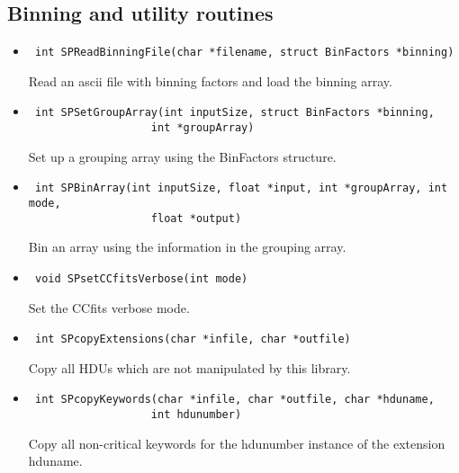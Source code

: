 \documentclass[11pt]{book}
\begin{document}
\subsection{Binning and utility routines}

\begin{itemize}

\item      \begin{verbatim} int SPReadBinningFile(char *filename, struct BinFactors *binning)\end{verbatim}

               Read an ascii file with binning factors and load the binning array.

\item      \begin{verbatim} int SPSetGroupArray(int inputSize, struct BinFactors *binning, 
                   int *groupArray)\end{verbatim}

               Set up a grouping array using the BinFactors structure.

\item      \begin{verbatim} int SPBinArray(int inputSize, float *input, int *groupArray, int mode, 
                   float *output)\end{verbatim}

               Bin an array using the information in the grouping array.

\item      \begin{verbatim} void SPsetCCfitsVerbose(int mode)\end{verbatim}

               Set the CCfits verbose mode.

\item      \begin{verbatim} int SPcopyExtensions(char *infile, char *outfile)\end{verbatim}

               Copy all HDUs which are not manipulated by this library.

\item      \begin{verbatim} int SPcopyKeywords(char *infile, char *outfile, char *hduname, 
                   int hdunumber)\end{verbatim}

               Copy all non-critical keywords for the hdunumber
               instance of the extension hduname.

\end{itemize}
\end{document}
